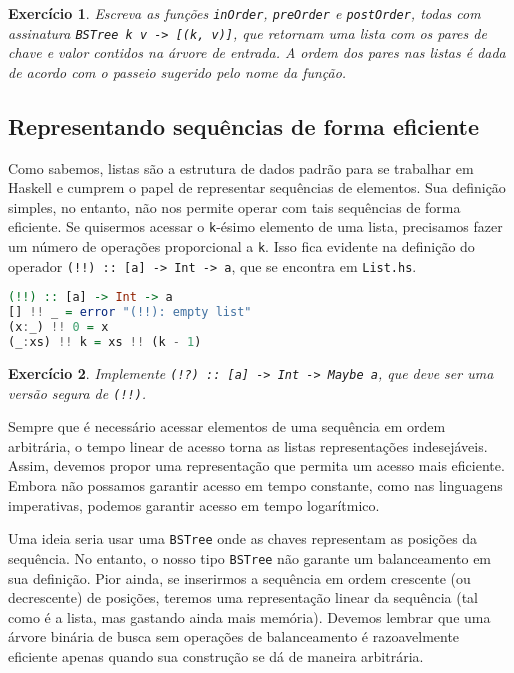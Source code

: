 \documentclass[a4paper]{article}
\newtheorem{exercicio}{Exercício}
\begin{document}
\begin{exercicio}
	Escreva as funções \emph{\texttt{inOrder}}, \emph{\texttt{preOrder}} e \emph{\texttt{postOrder}}, todas com assinatura \emph{\texttt{BSTree k v -> [(k, v)]}}, que retornam uma lista com os pares de chave e valor contidos na árvore de entrada.
	A ordem dos pares nas listas é dada de acordo com o passeio sugerido pelo nome da função.
\end{exercicio}

\subsection{Representando sequências de forma eficiente}

Como sabemos, listas são a estrutura de dados padrão para se trabalhar em Haskell e cumprem o papel de representar sequências de elementos.
Sua definição simples, no entanto, não nos permite operar com tais sequências de forma eficiente.
Se quisermos acessar o \texttt{k}-ésimo elemento de uma lista, precisamos fazer um número de operações proporcional a \texttt{k}.
Isso fica evidente na definição do operador \texttt{(!!) :: [a] -> Int -> a}, que se encontra em \texttt{List.hs}.

\begin{lstlisting}[language=haskell, frame=single]
(!!) :: [a] -> Int -> a
[] !! _ = error "(!!): empty list"
(x:_) !! 0 = x
(_:xs) !! k = xs !! (k - 1)
\end{lstlisting}

\begin{exercicio}
	Implemente \emph{\texttt{(!?) :: [a] -> Int -> Maybe a}}, que deve ser uma versão segura de \emph{\texttt{(!!)}}.
\end{exercicio}

Sempre que é necessário acessar elementos de uma sequência em ordem arbitrária, o tempo linear de acesso torna as listas representações indesejáveis.
Assim, devemos propor uma representação que permita um acesso mais eficiente.
Embora não possamos garantir acesso em tempo constante, como nas linguagens imperativas, podemos garantir acesso em tempo logarítmico.

Uma ideia seria usar uma \texttt{BSTree} onde as chaves representam as posições da sequência.
No entanto, o nosso tipo \texttt{BSTree} não garante um balanceamento em sua definição.
Pior ainda, se inserirmos a sequência em ordem crescente (ou decrescente) de posições, teremos uma representação linear da sequência (tal como é a lista, mas gastando ainda mais memória).
Devemos lembrar que uma árvore binária de busca sem operações de balanceamento é razoavelmente eficiente apenas quando sua construção se dá de maneira arbitrária.
\end{document}
